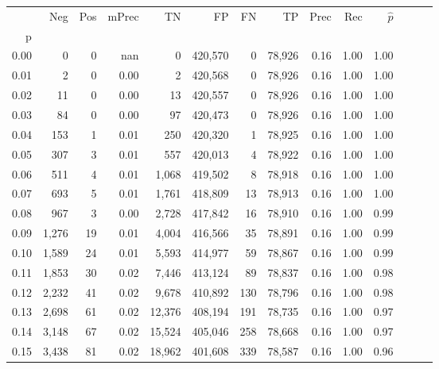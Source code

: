 \begin{tabular}{rrrrrrrrrrrrrr}
\toprule
{} &    Neg &    Pos & mPrec &       TN &       FP &      FN &      TP &  Prec &   Rec & $\hat{p}$ \\
p    &        &        &       &          &          &         &         &       &       &           \\
\midrule
0.00 &      0 &      0 &   nan &        0 &  420,570 &       0 &  78,926 &  0.16 &  1.00 &      1.00 \\
0.01 &      2 &      0 &  0.00 &        2 &  420,568 &       0 &  78,926 &  0.16 &  1.00 &      1.00 \\
0.02 &     11 &      0 &  0.00 &       13 &  420,557 &       0 &  78,926 &  0.16 &  1.00 &      1.00 \\
0.03 &     84 &      0 &  0.00 &       97 &  420,473 &       0 &  78,926 &  0.16 &  1.00 &      1.00 \\
0.04 &    153 &      1 &  0.01 &      250 &  420,320 &       1 &  78,925 &  0.16 &  1.00 &      1.00 \\
0.05 &    307 &      3 &  0.01 &      557 &  420,013 &       4 &  78,922 &  0.16 &  1.00 &      1.00 \\
0.06 &    511 &      4 &  0.01 &    1,068 &  419,502 &       8 &  78,918 &  0.16 &  1.00 &      1.00 \\
0.07 &    693 &      5 &  0.01 &    1,761 &  418,809 &      13 &  78,913 &  0.16 &  1.00 &      1.00 \\
0.08 &    967 &      3 &  0.00 &    2,728 &  417,842 &      16 &  78,910 &  0.16 &  1.00 &      0.99 \\
0.09 &  1,276 &     19 &  0.01 &    4,004 &  416,566 &      35 &  78,891 &  0.16 &  1.00 &      0.99 \\
0.10 &  1,589 &     24 &  0.01 &    5,593 &  414,977 &      59 &  78,867 &  0.16 &  1.00 &      0.99 \\
0.11 &  1,853 &     30 &  0.02 &    7,446 &  413,124 &      89 &  78,837 &  0.16 &  1.00 &      0.98 \\
0.12 &  2,232 &     41 &  0.02 &    9,678 &  410,892 &     130 &  78,796 &  0.16 &  1.00 &      0.98 \\
0.13 &  2,698 &     61 &  0.02 &   12,376 &  408,194 &     191 &  78,735 &  0.16 &  1.00 &      0.97 \\
0.14 &  3,148 &     67 &  0.02 &   15,524 &  405,046 &     258 &  78,668 &  0.16 &  1.00 &      0.97 \\
0.15 &  3,438 &     81 &  0.02 &   18,962 &  401,608 &     339 &  78,587 &  0.16 &  1.00 &      0.96 \\

\end{tabular}
